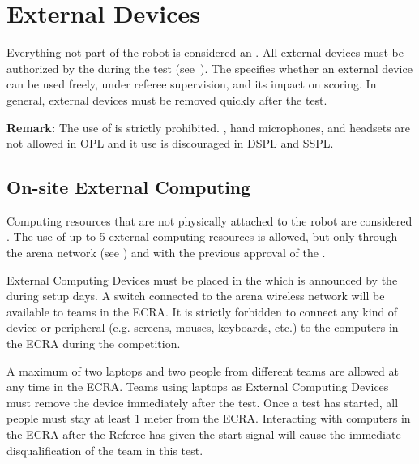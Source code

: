 % 
% 
\section{External Devices}
\label{rule:robot_external_devices}
Everything not part of the robot is considered an .
All external devices must be authorized by the  during the  test (see~).
The  specifies whether an external device can be used freely, under referee supervision, and its impact on scoring.
In general, external devices must be removed quickly after the test.
	
\noindent \textbf{Remark:} The use of  is strictly prohibited. , hand microphones, and headsets are not allowed in OPL and it use is discouraged in DSPL and SSPL.

\subsection{On-site External Computing}
Computing resources that are not physically attached to the robot are considered .
The use of up to 5 external computing resources is allowed, but only through the arena network (see ) and with the previous approval of the .

External Computing Devices must be placed in the  which is announced by the  during setup days.
A switch connected to the arena wireless network will be available to teams in the ECRA.
It is strictly forbidden to connect any kind of device or peripheral (e.g. screens, mouses, keyboards, etc.) to the computers in the ECRA during the competition.

A maximum of two laptops and two people from different teams are allowed at any time in the ECRA.
Teams using laptops as External Computing Devices must remove the device immediately after the test.
Once a test has started, all people must stay at least 1 meter from the ECRA.
Interacting with computers in the ECRA after the Referee has given the start signal will cause the immediate disqualification of the team in this test.

